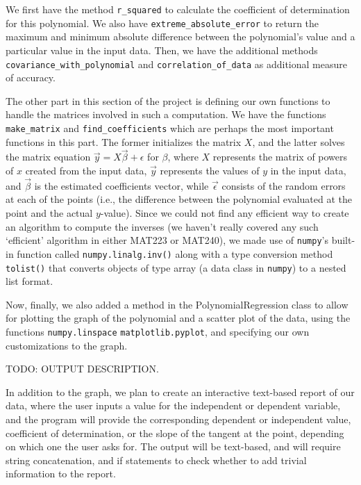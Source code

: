 \documentclass[12pt]{article}
\begin{document}
\begin{enumerate}
\begin{text}
We first have the method \texttt{r\_squared} to calculate the coefficient of determination for this polynomial. We also have \texttt{extreme\_absolute\_error} to return the maximum and minimum absolute difference between the polynomial's value and a particular value in the input data. Then, we have the additional methods \texttt{covariance\_with\_polynomial} and \texttt{correlation\_of\_data} as additional measure of accuracy.

The other part in this section of the project is defining our own functions to handle the matrices involved in such a computation. We have the functions \texttt{make\_matrix} and \texttt{find\_coefficients} which are perhaps the most important functions in this part. The former initializes the matrix $X$, and the latter solves the matrix equation $\vec{y} = X\vec{\beta} + \epsilon$ for $\beta$, where $X$ represents the matrix of powers of $x$ created from the input data, $\vec{y}$ represents the values of $y$ in the input data, and $\vec{\beta}$ is the estimated coefficients vector, while $\vec{\epsilon}$ consists of the random errors at each of the points (i.e., the difference between the polynomial evaluated at the point and the actual $y$-value). Since we could not find any efficient way to create an algorithm to compute the inverses (we haven't really covered any such `efficient' algorithm in either MAT223 or MAT240), we made use of \texttt{numpy}'s built-in function called \texttt{numpy.linalg.inv()} along with a type conversion method \texttt{tolist()} that converts objects of type array (a data class in \texttt{numpy}) to a nested list format.

Now, finally, we also added a method in the PolynomialRegression class to allow for plotting the graph of the polynomial and a scatter plot of the data, using the functions \texttt{numpy.linspace} \texttt{matplotlib.pyplot}, and specifying our own customizations to the graph.


TODO: OUTPUT DESCRIPTION.

In addition to the graph, we plan to create an interactive text-based report of our data, where the user inputs a value for the independent or dependent variable, and the program will provide the corresponding dependent or independent value, coefficient of determination, or the slope of the tangent at the point, depending on which one the user asks for. The output will be text-based, and will require string concatenation, and if statements to check whether to add trivial information to the report.


\end{text}
\end{enumerate}
\end{document}
